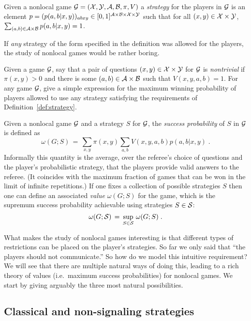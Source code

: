 \begin{definition}[Strategy]\label{def:strategy}
Given a nonlocal game $\mathcal{G}=(\mathcal{X},\mathcal{Y},\mathcal{A},\mathcal{B},\pi,V)$ a \emph{strategy} for the players in $\mathcal{G}$ is an element $p=(p(a,b|x,y))_{abxy} \in [0,1]^{\mathcal{A}\times \mathcal{B}\times \mathcal{X}\times \mathcal{Y}}$ such that for all $(x,y)\in\mathcal{X}\times \mathcal{Y}$, $\sum_{(a,b)\in\mathcal{A}\times \mathcal{B}} p(a,b|x,y) = 1$. 
\end{definition}

If \emph{any} strategy of the form specified in the definition was allowed for the players, the study of nonlocal games would be rather boring. 

\begin{exercise}\label{ex:nontrivial}
Given a game $\mathcal{G}$, say that a pair of questions $(x,y)\in\mathcal{X}\times \mathcal{Y}$ for $\mathcal{G}$ is \emph{nontrivial} if $\pi(x,y)>0$ and there is some $(a,b)\in \mathcal{A}\times \mathcal{B}$ such that $V(x,y,a,b)=1$.
For any game $\mathcal{G}$, give a simple expression for the maximum winning probability of players allowed to  use any strategy satisfying the requirements of Definition~\ref{def:strategy}.
\end{exercise}

Given a nonlocal game $\mathcal{G}$ and a strategy $S$ for $\mathcal{G}$, the \emph{success probability} of $S$ in $\mathcal{G}$ is defined as 
\[ \omega(G;S) \,=\, \sum_{x,y} \pi(x,y) \sum_{a,b} V(x,y,a,b) p(a,b|x,y)\;.\]
Informally this quantity is the average, over the referee's choice of questions and the player's probabilistic strategy, that the players provide valid answers to the referee. (It coincides with the maximum fraction of games that can be won in the limit of infinite repetitions.) 
If one fixes a collection of possible strategies $S$ then one can define an associated \emph{value} $\omega(G;S)$ for the game, which is the supremum success probability achievable using strategies $S\in\mathcal{S}$:
\[ \omega(G;\mathcal{S}) \,=\, \sup_{S\in\mathcal{S}} \,\omega(G;S)\;.\]





What makes the study of nonlocal games interesting is that different types of restrictions can be placed on the player's strategies. So far we only said that ``the players should not communicate.'' 
So how do we model this intuitive requirement?
We will see that there are multiple natural ways of doing this, leading to a rich theory of values (i.e.\ maximum success probabilities) for nonlocal games. We start by giving arguably the three most natural possibilities.

\subsection{Classical and non-signaling strategies}

